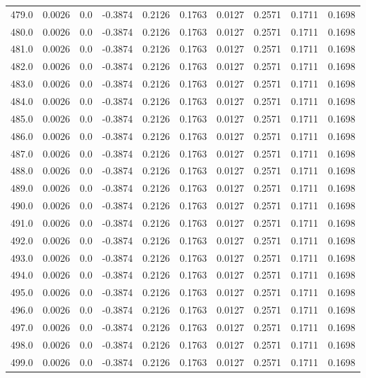 \begin{longtable}{lrrrrrrrrr}
479.0 & 0.0026 & 0.0 & -0.3874 & 0.2126 & 0.1763 & 0.0127 & 0.2571 & 0.1711 & 0.1698 \\
480.0 & 0.0026 & 0.0 & -0.3874 & 0.2126 & 0.1763 & 0.0127 & 0.2571 & 0.1711 & 0.1698 \\
481.0 & 0.0026 & 0.0 & -0.3874 & 0.2126 & 0.1763 & 0.0127 & 0.2571 & 0.1711 & 0.1698 \\
482.0 & 0.0026 & 0.0 & -0.3874 & 0.2126 & 0.1763 & 0.0127 & 0.2571 & 0.1711 & 0.1698 \\
483.0 & 0.0026 & 0.0 & -0.3874 & 0.2126 & 0.1763 & 0.0127 & 0.2571 & 0.1711 & 0.1698 \\
484.0 & 0.0026 & 0.0 & -0.3874 & 0.2126 & 0.1763 & 0.0127 & 0.2571 & 0.1711 & 0.1698 \\
485.0 & 0.0026 & 0.0 & -0.3874 & 0.2126 & 0.1763 & 0.0127 & 0.2571 & 0.1711 & 0.1698 \\
486.0 & 0.0026 & 0.0 & -0.3874 & 0.2126 & 0.1763 & 0.0127 & 0.2571 & 0.1711 & 0.1698 \\
487.0 & 0.0026 & 0.0 & -0.3874 & 0.2126 & 0.1763 & 0.0127 & 0.2571 & 0.1711 & 0.1698 \\
488.0 & 0.0026 & 0.0 & -0.3874 & 0.2126 & 0.1763 & 0.0127 & 0.2571 & 0.1711 & 0.1698 \\
489.0 & 0.0026 & 0.0 & -0.3874 & 0.2126 & 0.1763 & 0.0127 & 0.2571 & 0.1711 & 0.1698 \\
490.0 & 0.0026 & 0.0 & -0.3874 & 0.2126 & 0.1763 & 0.0127 & 0.2571 & 0.1711 & 0.1698 \\
491.0 & 0.0026 & 0.0 & -0.3874 & 0.2126 & 0.1763 & 0.0127 & 0.2571 & 0.1711 & 0.1698 \\
492.0 & 0.0026 & 0.0 & -0.3874 & 0.2126 & 0.1763 & 0.0127 & 0.2571 & 0.1711 & 0.1698 \\
493.0 & 0.0026 & 0.0 & -0.3874 & 0.2126 & 0.1763 & 0.0127 & 0.2571 & 0.1711 & 0.1698 \\
494.0 & 0.0026 & 0.0 & -0.3874 & 0.2126 & 0.1763 & 0.0127 & 0.2571 & 0.1711 & 0.1698 \\
495.0 & 0.0026 & 0.0 & -0.3874 & 0.2126 & 0.1763 & 0.0127 & 0.2571 & 0.1711 & 0.1698 \\
496.0 & 0.0026 & 0.0 & -0.3874 & 0.2126 & 0.1763 & 0.0127 & 0.2571 & 0.1711 & 0.1698 \\
497.0 & 0.0026 & 0.0 & -0.3874 & 0.2126 & 0.1763 & 0.0127 & 0.2571 & 0.1711 & 0.1698 \\
498.0 & 0.0026 & 0.0 & -0.3874 & 0.2126 & 0.1763 & 0.0127 & 0.2571 & 0.1711 & 0.1698 \\
499.0 & 0.0026 & 0.0 & -0.3874 & 0.2126 & 0.1763 & 0.0127 & 0.2571 & 0.1711 & 0.1698 \\

\end{longtable}
